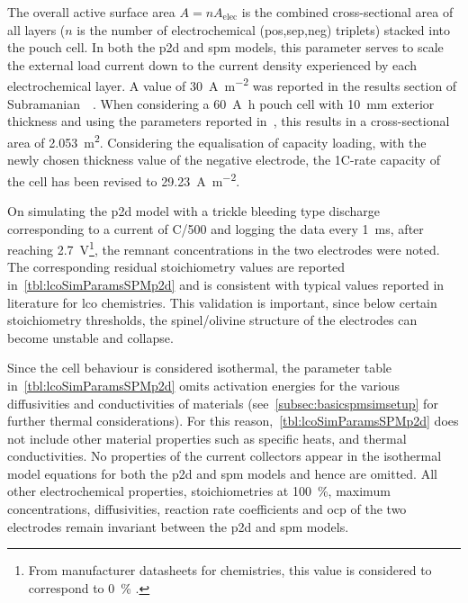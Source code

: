 The  overall  active  surface  area  $A  =  n  A_\text{elec}$  is  the  combined
cross-sectional  area  of all  layers  ($n$  is  the number  of  electrochemical
(pos,sep,neg) triplets) stacked  into the pouch cell. In both  the \gls{p2d} and
\gls{spm}  models, this  parameter serves  to  scale the  external load  current
down  to  the current  density  experienced  by  each electrochemical  layer.  A
value  of  \approx\SI{30}{\ampere \per  \meter  \squared}  was reported  in  the
results section of  Subramanian~\etal{}~\cite{Subramanian2009}. When considering
a \SI{60}{\ampere\hour} pouch cell with \SI{10}{\milli\meter} exterior thickness
and  using  the  parameters  reported  in~\cite{Subramanian2009},  this  results
in  a cross-sectional  area of  \SI{2.053}{\meter\squared}.  Considering  the
equalisation of capacity  loading, with the newly chosen thickness  value of the
negative  electrode, the  1C-rate  capacity  of the  cell  has  been revised  to
\SI{29.23}{\ampere\per\meter\squared}.

On  simulating  the \gls{p2d}  model  with  a  trickle bleeding  type  discharge
corresponding   to   a  current   of   C/500   and   logging  the   data   every
\SI{1}{\milli\second}, after reaching \SI{2.7}{\volt}\footnote{From manufacturer
datasheets  for   chemistries,  this value  is considered  to
correspond to \SI{0}{\percent} .}, the remnant concentrations
in  the two  electrodes  were noted.  The  corresponding residual  stoichiometry
values  are reported  in~\cref{tbl:lcoSimParamsSPMp2d}  and  is consistent  with
typical values reported in literature for \gls{lco} chemistries.  This validation is  important, since below  certain stoichiometry
thresholds, the spinel/olivine  structure of the electrodes  can become unstable
and  collapse.

Since   the   cell   behaviour   is   considered   isothermal,   the   parameter
table     in~\cref{tbl:lcoSimParamsSPMp2d}     omits     activation     energies
for    the   various    diffusivities    and    conductivities   of    materials
(see~\cref{subsec:basicspmsimsetup}  for  further thermal  considerations).  For
this  reason,~\cref{tbl:lcoSimParamsSPMp2d}  does  not  include  other  material
properties such  as specific  heats, and  thermal conductivities.  No properties
of  the  current  collectors  appear  in  the  isothermal  model  equations  for
both  the \gls{p2d}  and  \gls{spm}  models and  hence  are  omitted. All  other
electrochemical  properties,   \viz{}  stoichiometries   at  \SI{100}{\percent},
maximum concentrations, diffusivities, reaction  rate coefficients and \gls{ocp}
of  the two  electrodes remain  invariant  between the  \gls{p2d} and  \gls{spm}
models.

